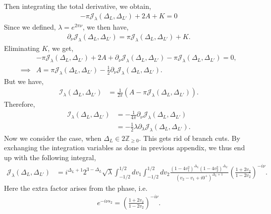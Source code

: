 \documentclass[11pt]{article}
\newcommand{\p}{\partial}
\newcommand{\lb}{\left(}
\newcommand{\rb}{\right)}
\begin{document}
Then integrating the total derivative, we obtain,
\begin{align}
    -\pi \mathcal{J}_\lambda(\Delta_L,\Delta_{L'}) + 2A + K = 0 
\end{align}
Since we defined, $\lambda = e^{2\pi \nu}$, we then have,
\begin{align}
    \p_\nu \mathcal{J}_\lambda(\Delta_L,\Delta_{L'}) = \pi \mathcal{J}_\lambda(\Delta_L,\Delta_{L'}) + K.
\end{align}
Eliminating $K$, we get,
\begin{align}
    &-\pi \mathcal{J}_\lambda(\Delta_L,\Delta_{L'}) + 2A + \p_\nu \mathcal{J}_\lambda(\Delta_L,\Delta_{L'}) - \pi \mathcal{J}_\lambda(\Delta_L,\Delta_{L'}) = 0,
    \\
    \implies &A = \pi \mathcal{J}_\lambda(\Delta_L,\Delta_{L'}) - \frac{1}{2}\p_\nu \mathcal{J}_\lambda(\Delta_L,\Delta_{L'}).
\end{align}
But we have,
\begin{align}
    \mathcal{I}_\lambda(\Delta_L,\Delta_{L'}) &= \frac{1}{2\pi} \lb A - \pi \mathcal{J}_\lambda(\Delta_L,\Delta_{L'})\rb.
\end{align}
Therefore,
\begin{align}\label{eq: relation between I and J lambda}
    \mathcal{I}_\lambda(\Delta_L,\Delta_{L'}) &= -\frac{1}{4\pi} \p_\nu \mathcal{J}_\lambda(\Delta_L,\Delta_{L'})\\
    &= -\frac{1}{2}\lambda \p_\lambda \mathcal{J}_\lambda(\Delta_L,\Delta_{L'}) .
\end{align}
Now we consider the case, when $\Delta_L\in 2\mathbb Z_{\geq 0}$. This gets rid of branch cuts. By exchanging the integration variables as done in previous appendix, we thus end up with the following integral,
\begin{align}
    \mathcal{J}_\lambda(\Delta_L,\Delta_{L'}) &= i^{\Delta_L+1} 2^{3-\Delta_L} \sqrt \lambda \int_{-1/2}^{1/2} dv_1 \int_{-1/2}^{1/2}dv_2 \frac{(1-4v_1^2)^{\Delta_L}(1-4v_2^2)^{\Delta_{L'}}}{(v_2 - v_1 + i0^+)^{\Delta_L+1}}\lb \frac{1+2v_2}{1-2v_2}\rb^{-i\nu}.
\end{align}
Here the extra factor arises from the phase, i.e.
\begin{align}
    e^{-i\nu s_2} = \lb\frac{1+2v_2}{1-2v_2}\rb^{-i\nu}.
\end{align}
\end{document}
